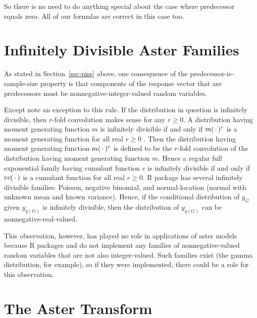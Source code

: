 So there is no need to do anything special about the case where predecessor
equals zero.  All of our formulas are correct in this case too.

\section{Infinitely Divisible Aster Families}
\label{sec:infinitely-divisible}

As stated in Section~\ref{sec:piss} above,
one consequence of the predecessor-is-sample-size property is that
components of the response vector
that are predecessors must be
nonnegative-integer-valued random variables.

Except \citet{aster1} note an exception to this rule.  If the distribution
in question is infinitely divisible, then $r$-fold convolution makes sense
for any $r \ge 0$.  A distribution having moment generating function $m$
is infinitely divisible if and only if $m(\,\cdot\,)^r$ is a moment generating
function for all real $r \ge 0$ \citep[Corollary~4.2.2]{cuppens}.
Then the distribution having moment
generating function $m(\,\cdot\,)^r$ is defined to be the $r$-fold convolution
of the distribution having moment generating function $m$.
Hence a regular full exponential family having cumulant function $c$
is infinitely divisible if and only if $r c(\,\cdot\,)$ is a cumulant
function for all real $r \ge 0$.
R package  \citep{aster-package} has several infinitely divisible
families: Poisson, negative binomial, and normal-location
(normal with unknown mean and known variance).
Hence, if the conditional distribution of $y_G$ given $y_{q(G)}$
is infinitely divisible, then
the distribution of $y_{q(G)}$ can be nonnegative-real-valued.

This observation, however, has played no role in applications of aster models
because R packages  and  do not implement any
families of nonnegative-valued random variables that are not
also integer-valued.  Such families exist (the gamma distribution,
for example), so if they were implemented, there could be a role for this
observation.

\section{The Aster Transform}
\label{sec:aster-transform}

